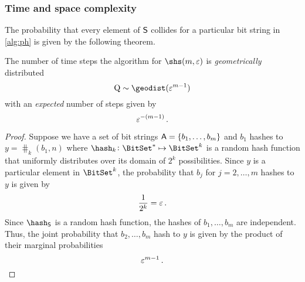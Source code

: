 \documentclass[ ../main.tex]{subfiles}
\begin{document}
\subsubsection{Time and space complexity}
The probability that every element of $\Set{S}$ collides for a particular bit string in \cref{alg:ph} is given by the following theorem.
\begin{theorem}
The number of time steps the algorithm for $\shs(m,\fprate)$ is \emph{geometrically} distributed
\begin{equation}
	\RV{Q} \sim \geodist(\fprate^{m-1})
\end{equation}
 with an \emph{expected} number of steps given by
\begin{equation}
\label{eq:p_m_N}
	\varepsilon^{-(m-1)}\,.
\end{equation}
\end{theorem}
\begin{proof}
Suppose we have a set of bit strings $\Set{A} = \{b_1,\ldots,b_m\}$ and $b_1$ hashes to $y = \hash_k(b_1,n)$ where $\hash_k \colon \BitSet^{*} \mapsto \BitSet^k$ is a random hash function that uniformly distributes over its domain of $2^k$ possibilities.
Since $y$ is a particular element in $\BitSet^k$, the probability that $b_j$ for $j=2,\ldots,m$ hashes to $y$ is given by
\begin{equation}
    \frac{1}{2^k} = \varepsilon\,.
\end{equation}
Since $\hash_{\Set{S}}$ is a random hash function, the hashes of $b_1,\ldots,b_m$ are independent.
Thus, the joint probability that $b_2, \ldots, b_m$ hash to $y$ is given by the product of their marginal probabilities
\begin{equation}
    \varepsilon^{m-1}\,.
\end{equation}
\end{proof}
\end{document}
